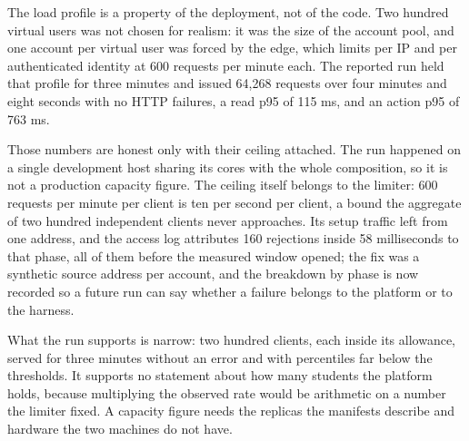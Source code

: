 The load profile is a property of the deployment, not of the code. Two hundred virtual users was not
chosen for realism: it was the size of the account pool, and one account per virtual user was forced
by the edge, which limits per IP and per authenticated identity at 600 requests per minute each. The
reported run held that profile for three minutes and issued 64,268 requests over four minutes and
eight seconds with no HTTP failures, a read p95 of 115 ms, and an action p95 of 763 ms.

Those numbers are honest only with their ceiling attached. The run happened on a single development
host sharing its cores with the whole composition, so it is not a production capacity figure. The
ceiling itself belongs to the limiter: 600 requests per minute per client is ten per second per
client, a bound the aggregate of two hundred independent clients never approaches. Its setup traffic
left from one address, and the access log
attributes 160 rejections inside 58 milliseconds to that phase, all of them before the measured window
opened; the fix was a synthetic source address per account, and the breakdown by phase is now recorded
so a future run can say whether a failure belongs to the platform or to the harness.

What the run supports is narrow: two hundred clients, each inside its allowance, served for three
minutes without an error and with percentiles far below the thresholds. It supports no
statement about how many students the platform holds, because multiplying the observed rate would be
arithmetic on a number the limiter fixed. A capacity figure needs the replicas the manifests describe
and hardware the two machines do not have.
